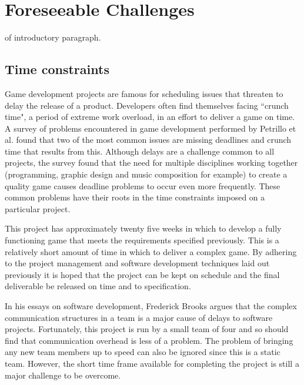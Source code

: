 \chapter[Foreseeable Challenges]{Foreseeable Challenges}
\label{ch:foreseeable_challenges}


 of introductory paragraph.

\section{Time constraints}

Game development projects are famous for scheduling issues that threaten to delay the
release of a product. Developers often find themselves facing ``crunch time", a period
of extreme work overload, in an effort to deliver a game on time.\cite[-1em]{groen2011}
A survey of problems encountered in game development performed by Petrillo et al. found
that two of the most common issues are missing deadlines and crunch time that results 
from this.\cite[1em]{petrillo2009} Although delays are a challenge common to all projects,
the survey found that the need for multiple disciplines working together (programming,
graphic design and music composition for example) to create a quality game causes
deadline problems to occur even more frequently. These common problems have their roots
in the time constraints imposed on a particular project.

This project has approximately twenty five weeks in which to develop a fully functioning
game that meets the requirements specified previously. This is a relatively short amount
of time in which to deliver a complex game. By adhering to the project management
and software development techniques laid out previously it is hoped that the project
can be kept on schedule and the final deliverable be released on time and to specification.

In his essays on software development, Frederick Brooks argues that the complex
communication structures in a team is a major cause of delays to software projects.\cite{brooks1995}
Fortunately, this project is run by a small team of four and so should find that
communication overhead is less of a problem. The problem of bringing any new team
members up to speed can also be ignored since this is a static team.
However, the short time frame available for completing the project is still a
major challenge to be overcome.

